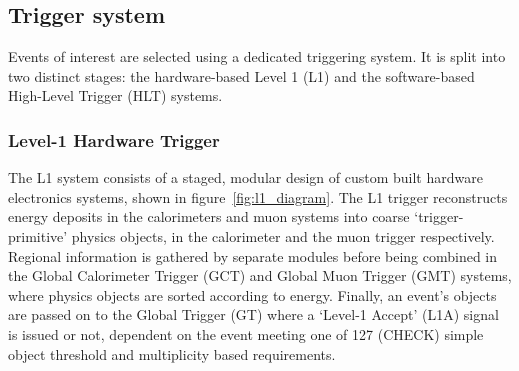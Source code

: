 \subsection{Trigger system}
Events of interest are selected using a dedicated triggering system. It is 
split into two distinct stages: the hardware-based Level 1 (L1) and
the software-based High-Level Trigger (HLT) systems.

\subsubsection{Level-1 Hardware Trigger}

The L1 system consists of a staged, modular design of custom built hardware 
electronics systems, shown in figure~\ref{fig:l1_diagram}. 
The L1 trigger reconstructs energy deposits in the calorimeters and muon systems
into coarse `trigger-primitive' physics objects, in the calorimeter and the muon 
trigger respectively. Regional information is gathered by separate modules 
before being combined in the Global Calorimeter Trigger (GCT) and Global Muon 
Trigger (GMT) systems, where physics objects are sorted according to energy. 
Finally, an event's objects are passed on to the Global Trigger (GT) where a 
`Level-1 Accept' (L1A) signal is issued or not, dependent on the event meeting 
one of 127 (CHECK) simple object threshold and multiplicity based requirements.


